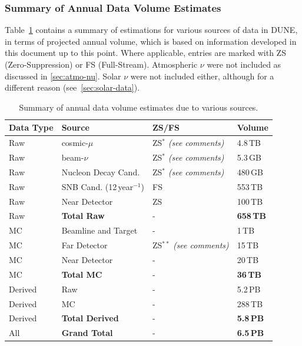 \subsubsection{Summary of Annual Data Volume Estimates}
Table~\ref{tab:summary-data-table} contains a summary of estimations for various sources
of data in DUNE, in terms of projected annual volume, which is based on information developed in
this document up to this point. Where applicable, entries are marked with ZS (Zero-Suppression) or
FS (Full-Stream). Atmospheric $\nu$ were not included as discussed in \ref{sec:atmo-nu}. Solar $\nu$ were not
included either, although for a different reason (see~\ref{sec:solar-data}).
\begin{table}[ht!]
	\centering
	\begin{tabular}{| p{1.2in}| p{1.73in} | p{1.5in} | p{0.62in} |}
		\hline
		\textbf{Data Type} & \textbf{Source} & \textbf{ZS/FS} & \textbf{Volume} \\ \hline
		Raw & cosmic-$\mu$  & ZS$^*$ \textit{(see comments)}& 4.8\,TB \\	\hline
		Raw & beam-$\nu$  & ZS$^*$ \textit{(see comments)}& 5.3\,GB  \\	\hline
		Raw & Nucleon Decay Cand.  & ZS$^*$ \textit{(see comments)}& 480\,GB  \\	\hline
		Raw & SNB Cand. (12\,year$^{-1}$) & FS & 553\,TB \\	\hline \hline %
		Raw & Near Detector & ZS & 100\,TB \\	\hline \hline \hline
		Raw & \textbf{Total Raw} & - & \textbf{658\,TB} \\		\hline \hline \hline
		MC & Beamline and Target  & - & 1\,TB \\	\hline
		MC & Far Detector & ZS$^{**}$  \textit{(see comments)}  & 15\,TB \\		\hline
		MC & Near Detector & - &20\,TB \\ \hline \hline \hline
		MC & \textbf{Total MC} & - & \textbf{36\,TB} \\		\hline \hline \hline
		Derived &  Raw  & - & 5.2\,PB \\	\hline
		Derived &  MC  & - & 288\,TB \\	\hline  \hline \hline
		Derived & \textbf{Total Derived} & - & \textbf{5.8\,PB} \\		\hline \hline \hline
		All & \textbf{Grand Total} & - & \textbf{6.5\,PB} \\		\hline %
	\end{tabular}
	\caption{Summary of annual data volume estimates due to various sources.}
	\label{tab:summary-data-table}
\end{table}

